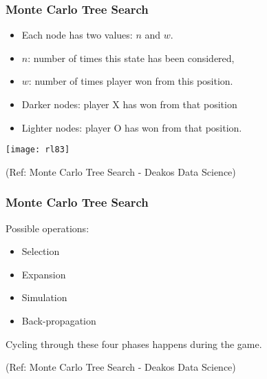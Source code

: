\begin{frame}[fragile]\frametitle{Monte Carlo Tree Search}

\begin{itemize}
\item  Each node has two values: $n$ and $w$. 
\item $n$: number of times this state has been considered, 
\item $w$: number of times player won from this position. 
\item Darker nodes: player X has won from that position
\item Lighter nodes: player O has won from that position.
\end{itemize}


\begin{center}
\texttt{[image: rl83]}
\end{center}


{\tiny (Ref: Monte Carlo Tree Search - Deakos Data Science)}

\end{frame}

\begin{frame}[fragile]\frametitle{Monte Carlo Tree Search}

Possible operations:
\begin{itemize}
\item Selection
\item Expansion
\item Simulation
\item Back-propagation
\end{itemize}

Cycling through these four phases happens during the game.

{\tiny (Ref: Monte Carlo Tree Search - Deakos Data Science)}

\end{frame}

